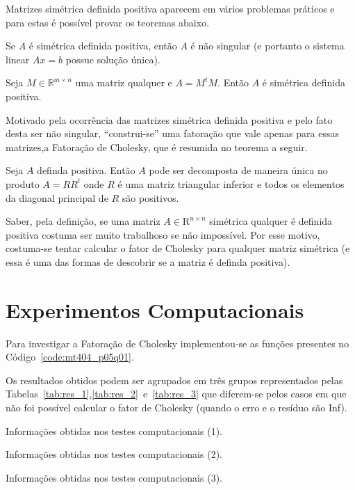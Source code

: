 \documentclass[12pt,a4paper]{article}
\begin{document}
Matrizes simétrica definida positiva aparecem em vários problemas práticos e
para estas é possível provar os teoremas abaixo.
\begin{teo}
    Se $A$ é simétrica definida positiva, então $A$ é não singular (e portanto o
    sistema linear $A x = b$ possue solução única).
\end{teo}
\begin{teo}
    Seja $M \in \mathbb{R}^{m \times n}$ uma matriz qualquer e $A = M^t M$.
    Então $A$ é simétrica definida positiva.
\end{teo}

Motivado pela ocorrência das matrizes simétrica definida positiva e pelo fato
desta ser não singular, ``construi-se'' uma fatoração que vale apenas para essas
matrizes,a Fatoração de Cholesky, que é resumida no teorema a seguir.
\begin{teo}
    Seja $A$ definda positiva. Então $A$ pode ser decomposta de maneira única no
    produto $A = R R^t$ onde $R$ é uma matriz triangular inferior e todos os
    elementos da diagonal principal de $R$ são positivos.
\end{teo}

Saber, pela definição, se uma matriz $A \in \mathrm{R}^{n \times n}$ simétrica
qualquer é definida positiva costuma ser muito trabalhoso se não impossível. Por
esse motivo, costuma-se tentar calcular o fator de Cholesky para qualquer matriz
simétrica (e essa é uma das formas de descobrir se a matriz é definda positiva).

\section{Experimentos Computacionais}
Para investigar a Fatoração de Cholesky implementou-se as funções presentes no
Código~\ref{code:mt404_p05q01}.

Os resultados obtidos podem ser agrupados em três grupos representados pelas
Tabelas~\ref{tab:res_1},\ref{tab:res_2}~e~\ref{tab:res_3} que diferem-se pelos
casos em que não foi possível calcular o fator de Cholesky (quando o erro e o
resíduo são Inf).
\begin{table}[!htb]
    \centering
    \caption{Informações obtidas nos testes computacionais (1).}
    \label{tab:res_1}
\end{table}
\begin{table}[!htb]
    \centering
    \caption{Informações obtidas nos testes computacionais (2).}
    \label{tab:res_2}
\end{table}
\begin{table}[!htb]
    \centering
    \caption{Informações obtidas nos testes computacionais (3).}
    \label{tab:res_3}
\end{table}
\end{document}
